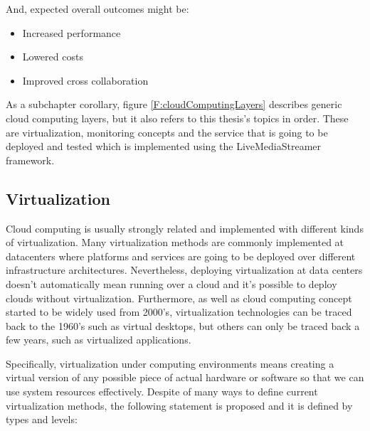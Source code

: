 And, expected overall outcomes might be:

\begin{itemize}
\item Increased performance
\item Lowered costs
\item Improved cross collaboration
\end{itemize}

As a subchapter corollary, figure \ref{F:cloudComputingLayers} describes generic cloud computing layers, but it also refers to this thesis's topics in order. These are virtualization, monitoring concepts and the service that is going to be deployed and tested which is implemented using the LiveMediaStreamer framework.

\subsection{Virtualization}\label{SOA:Virtualization}

Cloud computing is usually strongly related and implemented with different kinds of virtualization. Many virtualization methods are commonly implemented at datacenters where platforms and services are going to be deployed over different infrastructure architectures. Nevertheless, deploying virtualization at data centers doesn’t automatically mean running over a cloud and it’s possible to deploy clouds without virtualization. Furthermore, as well as cloud computing concept started to be widely used from 2000's, virtualization  technologies can be traced back to the 1960’s such as virtual desktops, but others can only be traced back a few years, such as virtualized applications.

Specifically, virtualization under computing environments means creating a virtual version of any possible piece of actual hardware or software so that we can use system resources effectively. Despite of many ways to define current virtualization methods, the following statement is proposed and it is defined by types and levels:

